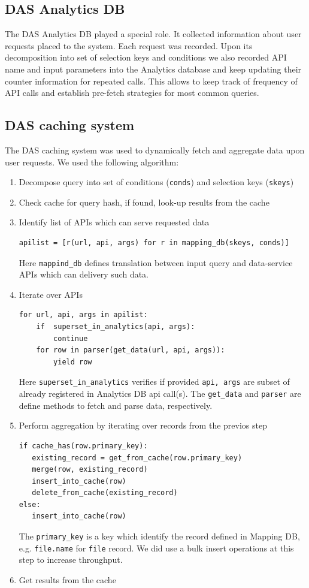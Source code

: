 \documentclass[1p,times]{elsarticle}
\begin{document}
\subsection{DAS Analytics DB}
The DAS Analytics DB played a special role. It collected information
about user requests placed to the system. Each request was recorded. Upon its
decomposition into set of selection keys and conditions we also recorded
API name and input parameters into the Analytics database and 
keep updating their counter information for repeated calls. 
This allows to keep track of frequency of API calls and establish 
pre-fetch strategies for most common queries.

\subsection{DAS caching system}
The DAS caching system was used to dynamically fetch
and aggregate data upon user requests. We used the following 
algorithm:
\begin{enumerate}[1.]
\item Decompose query into set of conditions (\verb+conds+) 
and selection keys (\verb+skeys+)
\item Check cache for query hash, if found, look-up results from the cache
\item Identify list of APIs which can serve requested data
\begin{verbatim}
apilist = [r(url, api, args) for r in mapping_db(skeys, conds)]
\end{verbatim}
Here \verb+mappind_db+ defines translation between input query and data-service
APIs which can delivery such data.
\item Iterate over APIs
\begin{verbatim}
for url, api, args in apilist:
    if  superset_in_analytics(api, args):
        continue
    for row in parser(get_data(url, api, args)):
        yield row
\end{verbatim}
Here \verb+superset_in_analytics+ verifies if provided \verb+api, args+
are subset of already registered in Analytics DB api call(s). The 
\verb+get_data+ and \verb+parser+ are define methods to fetch and parse
data, respectively.
\item Perform aggregation by iterating over records from the previos step
\begin{verbatim}
if cache_has(row.primary_key):
   existing_record = get_from_cache(row.primary_key)
   merge(row, existing_record)
   insert_into_cache(row)
   delete_from_cache(existing_record)
else:
   insert_into_cache(row)
\end{verbatim}
The \verb+primary_key+
is a key which identify the record defined in Mapping DB, e.g. \verb+file.name+
for \verb+file+ record.
We did use a bulk insert operations at this step to increase throughput. 
\item Get results from the cache
\end{enumerate}
\end{document}
